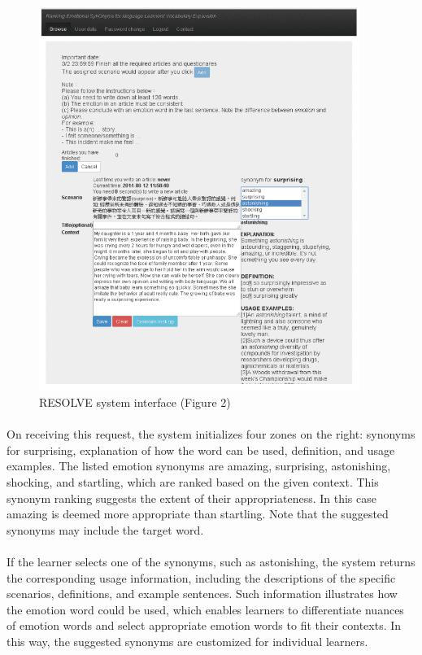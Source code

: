 \documentclass[a4paper,12pt,oneside]{article}
\let\counterwithin\relax
\begin{document}
\begin{figure}[H]
\includegraphics[height=12.5cm,width=10.46cm]{Figure2.png}
\centering
\caption{RESOLVE system interface (Figure 2)}
\end{figure}

\paragraph{}
On receiving this request, the system initializes four zones on the right: synonyms for surprising, explanation of how the word can be used, definition, and usage examples. The listed emotion synonyms are amazing, surprising, astonishing, shocking, and startling, which are ranked based on the given context. This synonym ranking suggests the extent of their appropriateness. In this case amazing is deemed more appropriate than startling. Note that the suggested synonyms may include the target word. 
\paragraph{}
If the learner selects one of the synonyms, such as astonishing, the system returns the corresponding usage information, including the descriptions of the specific scenarios, definitions, and example sentences. Such information illustrates how the emotion word could be used, which enables learners to differentiate nuances of emotion words and select appropriate emotion words to fit their contexts. In this way, the suggested synonyms are customized for individual learners. 
\end{document}
